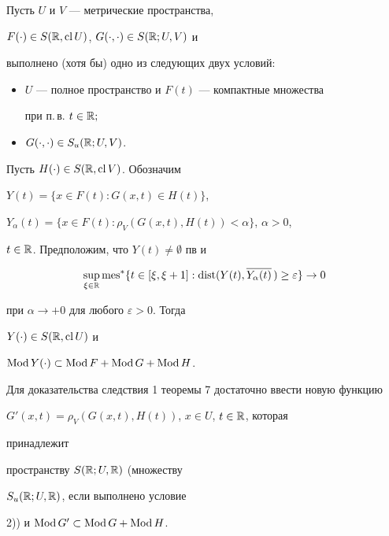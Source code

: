 \begin{cor}


Пусть $U$ и $V$ --- метрические пространства,


$F(\cdot)\in S(\Bbb R,\operatorname{cl} U)$, $G(\cdot,\cdot)\in S(\Bbb R;U,V)$ и


выполнено (хотя бы) одно из следующих двух условий$:$


\begin{itemize}


\item[1)] $U$ --- полное пространство и $F(t)$ --- компактные множества


при п.\,в. $t\in\Bbb R;$


\item[2)] $G(\cdot,\cdot)\in S_u(\Bbb R;U,V)$.


\end{itemize}


Пусть $H(\cdot)\in S(\Bbb R,\operatorname{cl} V)$. Обозначим


$Y(t)=\{x\in F(t):G(x,t)\in H(t)\}$,


$Y_\alpha(t)=\{x\in F(t):\rho_V(G(x,t),H(t))<\alpha\}$, $\alpha>0$,


$t\in\Bbb R$. Предположим, что $Y(t)\ne\emptyset$ пв и


$$


\sup_{\xi\in\Bbb R}\mes^*\{t\in[\xi,\xi+1]:\dist


(Y(t),\overline{Y_\alpha(t)}\,)\ge\varepsilon\}\to 0


$$


при $\alpha\to+0$ для любого $\varepsilon>0$. Тогда


$Y(\cdot)\in S(\Bbb R,\operatorname{cl} U)$ и


$\operatorname{Mod} Y(\cdot)\subset\operatorname{Mod} F+\operatorname{Mod} G+\operatorname{Mod} H$.


\end{cor}





Для доказательства следствия 1 теоремы 7 достаточно ввести новую функцию


$G'(x,t)=\rho_V(G(x,t),H(t))$, $x\in U$, $t\in\Bbb R$, которая


принадлежит


пространству $S(\Bbb R;U,\Bbb R)$ (множеству


$S_u(\Bbb R;U,\Bbb R)$, если выполнено условие


2)) и $\operatorname{Mod} G'\subset\operatorname{Mod} G+\operatorname{Mod} H$.





